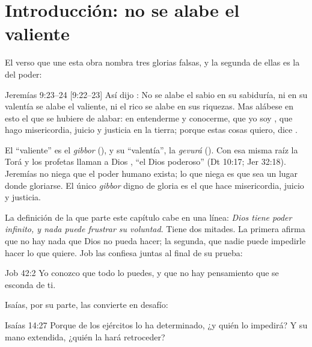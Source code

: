 
\section{Introducción: no se alabe el valiente}

El verso que une esta obra nombra tres glorias falsas, y la segunda de ellas es la del poder:

\begin{verso}{Jeremías 9:23–24 [9:22–23]}
Así dijo \SENOR: No se alabe el sabio en su sabiduría, ni en su valentía se alabe el valiente, ni el rico se alabe en sus riquezas. Mas alábese en esto el que se hubiere de alabar: en entenderme y conocerme, que yo soy \SENOR, que hago misericordia, juicio y justicia en la tierra; porque estas cosas quiero, dice \SENOR.
\end{verso}

El ``valiente'' es el \emph{gibbor} (), y su ``valentía'', la \emph{gevurá} (). Con esa misma raíz la Torá y los profetas llaman a Dios , ``el Dios poderoso'' (Dt 10:17; Jer 32:18). Jeremías no niega que el poder humano exista; lo que niega es que sea un lugar donde gloriarse. El único \emph{gibbor} digno de gloria es el que hace misericordia, juicio y justicia.

La definición de la que parte este capítulo cabe en una línea: \emph{Dios tiene poder infinito, y nada puede frustrar su voluntad}. Tiene dos mitades. La primera afirma que no hay nada que Dios no pueda hacer; la segunda, que nadie puede impedirle hacer lo que quiere. Job las confiesa juntas al final de su prueba:

\begin{verso}{Job 42:2}
Yo conozco que todo lo puedes, y que no hay pensamiento que se esconda de ti.
\end{verso}

Isaías, por su parte, las convierte en desafío:

\begin{verso}{Isaías 14:27}
Porque \SENOR{} de los ejércitos lo ha determinado, ¿y quién lo impedirá? Y su mano extendida, ¿quién la hará retroceder?
\end{verso}

